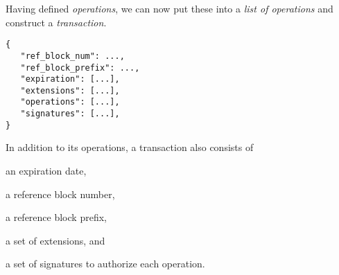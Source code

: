 Having defined \emph{operations}, we can now put these into a \emph{list of
operations} and construct a \emph{transaction}.

\begin{verbatim}
{
   "ref_block_num": ...,
   "ref_block_prefix": ...,
   "expiration": [...],
   "extensions": [...],
   "operations": [...],
   "signatures": [...],
}
\end{verbatim}

In addition to its operations, a transaction also consists of 
\begin{inparaenum}[(a)]
 \item an expiration date,
 \item a reference block number,
 \item a reference block prefix,
 \item a set of extensions, and
 \item a set of signatures to authorize each operation.
\end{inparaenum}
